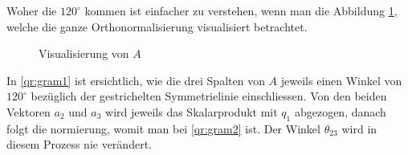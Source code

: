 Woher die $120^\circ$ kommen ist einfacher zu verstehen, wenn man die Abbildung \ref{qr:gram}, welche die ganze Orthonormalisierung visualisiert betrachtet.
\begin{figure}[ht]
	\centering
	\caption{Visualisierung von $A$\label{qr:gram}}
\end{figure}
In \ref{qr:gram1} ist ersichtlich, wie die drei Spalten von $A$ jeweils einen Winkel von $120^\circ$ bezüglich der gestrichelten Symmetrielinie einschliessen.
Von den beiden Vektoren $a_2$ und $a_3$ wird jeweils das Skalarprodukt mit $q_1$ abgezogen, danach folgt die normierung, womit man bei \ref{qr:gram2} ist.
Der Winkel $\theta_{23}$ wird in diesem Prozess nie verändert.